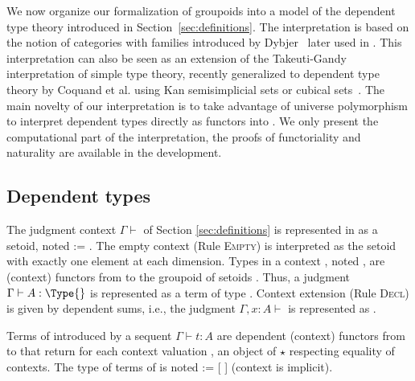
\begin{coqdoccode}
\end{coqdoccode}


  We now organize our formalization of groupoids into a model of the dependent 
  type theory introduced in Section~\ref{sec:definitions}.
  The interpretation is based on the notion of categories with families 
  introduced by Dybjer~\cite{dybjer:internaltt} later used in \cite{groupoid-interp}.
  This interpretation can also be seen as an extension of the Takeuti-Gandy interpretation of simple type theory, recently generalized to dependent type theory by Coquand et al. using Kan semisimplicial sets or cubical sets~\cite{barras:_gener_takeut_gandy_inter}. 
  The main novelty of our interpretation is to
  take advantage of universe polymorphism to interpret dependent types
  directly as functors into . 
  We only present the computational part of the interpretation, the
  proofs of functoriality and naturality are available in the \Coq development.


\subsection{Dependent types}




  The judgment context $\Gamma \vdash$ of Section
  \ref{sec:definitions} is represented in \Coq as a setoid, noted
   := . The empty context (Rule \textsc{Empty})
  is interpreted as the setoid with exactly one element at each
  dimension.  Types in a context , noted  , are (context)
  functors from  to the groupoid of setoids .  Thus, a
  judgment $\Gamma \vdash A : \Type{}$ is represented as a term  of
  type  . Context extension (Rule \textsc{Decl}) is given by
  dependent sums, i.e., the judgment $\Gamma, x:A \vdash$ is represented
  as \coqdocvar{$\Sigma$} .


\begin{coqdoccode}
\end{coqdoccode}
Terms of  introduced by a sequent $\Gamma \vdash t:A$ are
  dependent (context) functors from  to  that return for each
  context valuation \coqdocvariable{$\gamma$}, an object of  $\star$ \coqdocvariable{$\gamma$} respecting equality of
  contexts.  The type of terms of  is noted   := [\coqdocdefinition{$\Pi$} ]
  (context is implicit).  

